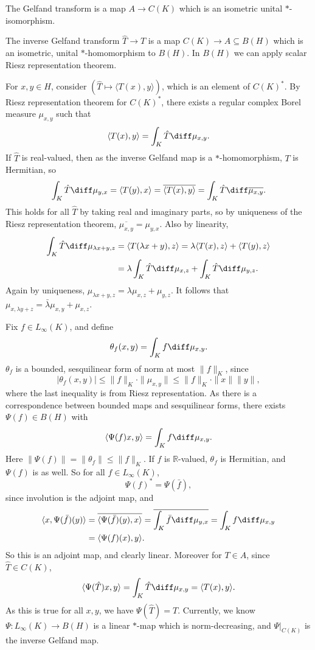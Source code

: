 \documentclass[12pt]{article}
\begin{document}
\begin{proofbox}
	The Gelfand transform is a map $A \to C(K)$ which is an isometric unital $\ast$-isomorphism.

	The inverse Gelfand transform $\hat T \to T$ is a map $C(K) \to A \subseteq B(H)$ which is an isometric, unital $\ast$-homomorphism to $B(H)$. In $B(H)$ we can apply scalar Riesz representation theorem.

	For $x, y \in H$, consider $(\hat T \mapsto \langle T(x), y \rangle)$, which is an element of $C(K)^{\ast}$. By Riesz representation theorem for $C(K)^{\ast}$, there exists a regular complex Borel measure $\mu_{x,y}$ such that
	\[
	\langle T(x), y \rangle = \int_K \hat T \diff \mu_{x,y}.
	\]
	If $\hat T$ is real-valued, then as the inverse Gelfand map is a $\ast$-homomorphism, $T$ is Hermitian, so
	\[
	\int_K \hat T \diff \mu_{y, x} = \langle T(y), x \rangle = \overline{\langle T(x), y \rangle} = \int_K \hat T \diff \overline{\mu_{x,y}}.
	\]
	This holds for all $\hat T$ by taking real and imaginary parts, so by uniqueness of the Riesz representation theorem, $\overline{\mu_{x,y}} = \mu_{y,x}$. Also by linearity,
	\begin{align*}
		\int_K \hat T \diff \mu_{\lambda x + y, z} &= \langle T(\lambda x + y), z \rangle = \lambda \langle T(x), z \rangle + \langle T(y), z\rangle \\
							   &= \lambda \int_K \hat T \diff \mu_{x,z} + \int_K \hat T \diff \mu_{y,z}.
	\end{align*}
	Again by uniqueness, $\mu_{\lambda x + y,z} = \lambda \mu_{x,z} + \mu_{y, z}$. It follows that $\mu_{x, \lambda y + z} = \bar \lambda \mu_{x, y} + \mu_{x, z}$.

	Fix $f \in L_\infty(K)$, and define
	\[
	\theta_f(x, y) = \int_K f \diff \mu_{x, y}.
	\]
	$\theta_f$ is a bounded, sesquilinear form of norm at most $\|f\|_K$, since
	\[
	|\theta_f(x, y)| \leq \|f\|_K \cdot \|\mu_{x, y}\| \leq \|f\|_K \cdot \|x\| \|y\|,
	\]
	where the last inequality is from Riesz representation. As there is a correspondence between bounded maps and sesquilinear forms, there exists $\Psi(f) \in B(H)$ with
	\[
	\langle \Psi(f) x, y \rangle = \int_K f \diff \mu_{x, y}.
	\]
	Here $\|\Psi(f)\| = \|\theta_f\| \leq \|f\|_K$. If $f$ is $\mathbb{R}$-valued, $\theta_f$ is Hermitian, and $\Psi(f)$ is as well. So for all $f \in L_\infty(K)$,
	\[
	\Psi(f)^{\ast} = \Psi(\bar f),
	\]
	since involution is the adjoint map, and
	\begin{align*}
		\langle x, \Psi(\bar f)(y) \rangle &= \overline{\langle \Psi(\bar f)(y), x \rangle} = \overline{ \int_K \bar f \diff \mu_{y,x}} = \int_K f \diff \mu_{x, y} \\
						   &= \langle \Psi(f)(x), y\rangle.
	\end{align*}
	So this is an adjoint map, and clearly linear. Moreover for $T \in A$, since $\hat T \in C(K)$,
	\[
	\langle \Psi(\hat T) x, y \rangle = \int_K \hat T \diff \mu_{x, y} = \langle T(x), y \rangle.
	\]
	As this is true for all $x, y$, we have $\Psi(\hat T) = T$. Currently, we know $\Psi : L_\infty(K) \to B(H)$ is a linear $\ast$-map which is norm-decreasing, and $\Psi|_{C(K)}$ is the inverse Gelfand map.


\end{proofbox}
\end{document}
